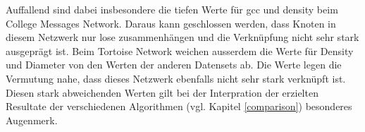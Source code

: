 Auffallend sind dabei insbesondere die tiefen Werte für \acs{gcc} und \acs{density} beim College Messages Network.
Daraus kann geschlossen werden, dass Knoten in diesem Netzwerk nur lose zusammenhängen und die Verknüpfung nicht sehr stark ausgeprägt ist.
Beim Tortoise Network weichen ausserdem die Werte für Density und Diameter von den Werten der anderen Datensets ab.
Die Werte legen die Vermutung nahe, dass dieses Netzwerk ebenfalls nicht sehr stark verknüpft ist.
Diesen stark abweichenden Werten gilt bei der Interpration der erzielten Resultate der verschiedenen Algorithmen (vgl. Kapitel \ref{comparison}) besonderes Augenmerk.
